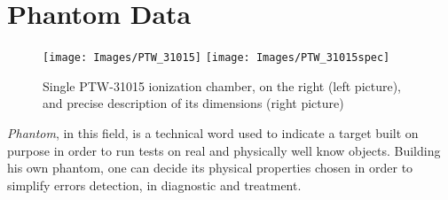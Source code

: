 \documentclass[12pt, a4paper, twoside]{book}
\begin{document}
%
%
%
%
%
%
%
%
\newpage





\section{Phantom Data}
\begin{figure}[h]
{\texttt{[image: Images/PTW\_31015]}}
{\texttt{[image: Images/PTW\_31015spec]}}
\caption{Single PTW-31015 ionization chamber, on the right (left picture), and precise description of its dimensions (right picture)}
\label{fig:31015}
\end{figure}
\emph{Phantom}, in this field, is a technical word used to indicate a target built on purpose in order to run tests on real and physically well know objects. Building his own phantom, one can decide its physical properties chosen in order to simplify errors detection, in diagnostic and treatment. 
\end{document}
